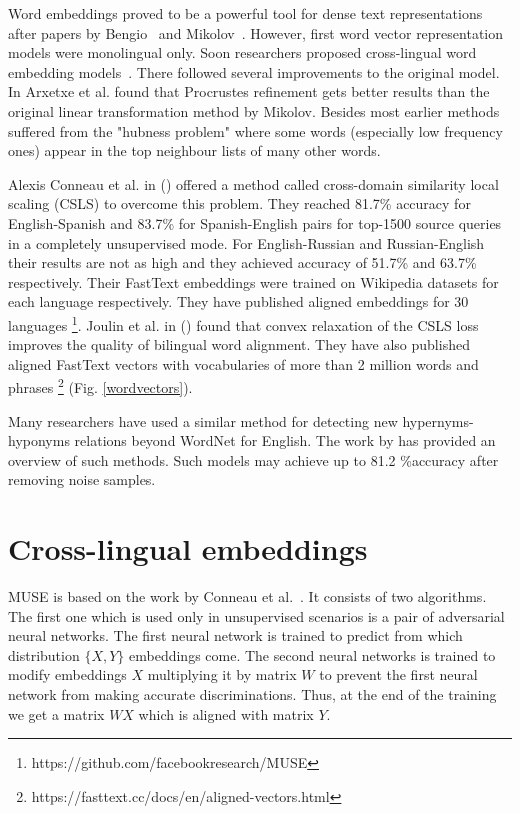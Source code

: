 \documentclass[11pt,a4paper]{article}
\begin{document}
Word embeddings proved to be a powerful tool for dense text representations after papers by Bengio~\cite{bengio} and Mikolov~\cite{mikolov-representations-2013}. However, first word vector representation models were monolingual only. Soon researchers proposed cross-lingual word embedding models~\cite{mikolov-parallel}. There followed several improvements to the original model. In \citeyear{artetxe2016learning} Arxetxe et al. found that Procrustes refinement gets better results than the original linear transformation method by Mikolov. Besides most earlier methods suffered from the "hubness problem" where some words (especially low frequency ones) appear in the top neighbour lists of many other words.

Alexis Conneau et al. in (\citeyear{muse}) offered a method called cross-domain similarity local scaling (CSLS) to overcome this problem. They reached 81.7\% accuracy for English-Spanish and 83.7\% for Spanish-English pairs for top-1500 source queries in a completely unsupervised mode. For English-Russian and Russian-English their results are not as high and they achieved accuracy of 51.7\% and 63.7\% respectively. Their FastText embeddings were trained on Wikipedia datasets for each language respectively. They have published aligned embeddings for 30 languages \footnote{https://github.com/facebookresearch/MUSE}. Joulin et al. in (\citeyear{joulin2018loss}) found that convex relaxation of the CSLS loss improves the quality of bilingual word alignment. They have also published aligned FastText vectors with vocabularies of more than 2 million words and phrases \footnote{https://fasttext.cc/docs/en/aligned-vectors.html} (Fig. \ref*{wordvectors}).

Many researchers have used a similar method for detecting new hypernyms-hyponyms relations beyond WordNet for English. The work by \cite{sanchez2017well} has provided an overview of such methods. Such models may achieve up to 81.2 \%accuracy after removing noise samples.


\section{Cross-lingual embeddings}

MUSE is based on the work by Conneau et al.~\cite{muse}. It consists of two algorithms. The first one which is used only in unsupervised scenarios is a pair of adversarial neural networks. The first neural network is trained to predict from which distribution $\{X, Y\}$ embeddings come. The second neural networks is trained to modify embeddings $X$ multiplying it by matrix $W$ to prevent the first neural network from making accurate discriminations. Thus, at the end of the training we get a matrix $WX$ which is aligned with matrix $Y$.
\end{document}
